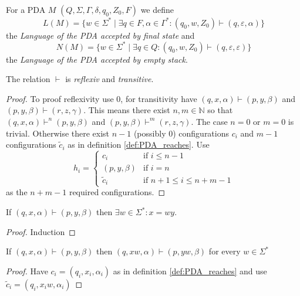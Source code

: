 \begin{definition}
  \label{def:PDA_language}

  For a PDA $M$ $(Q,\Sigma,\Gamma,\delta,q_0,Z_0,F)$ we define $$L(M)=\{w\in\Sigma^*\mid
  \exists q\in F,\alpha\in\Gamma^*: (q_0,w,Z_0)\vdash(q,\varepsilon,\alpha)\}$$ the
  \emph {Language of the PDA accepted by final state} and $$N(M)=\{w\in\Sigma^*\mid
  \exists q\in Q: (q_0,w,Z_0)\vdash(q,\varepsilon,\varepsilon)\}$$ the
  \emph {Language of the PDA accepted by empty stack}.

\end{definition}
\begin{theorem}\label{thm:PDA_reaches}
  The relation $\vdash$ is \emph{reflexiv} and \emph{transitive}.
\end{theorem}
\begin{proof}
  To proof reflexivity use $0$,
  for transitivity have  $(q,x,\alpha)\vdash(p,y,\beta)$ and
  $(p,y,\beta)\vdash(r,z,\gamma)$. This means there exist $n,m\in\mathbb{N}$ so that
  $(q,x,\alpha)\vdash^n(p,y,\beta)$ and $(p,y,\beta)\vdash^m(r,z,\gamma)$.
  The case $n=0$ or $m=0$ is trivial. Otherwise there exist $n-1$ (possibly $0$) configurations
  $c_i$ and $m-1$ configurations $\tilde{c}_i$ as in definition \ref{def:PDA_reaches}.
  Use
  $$
  h_i =
  \begin{cases}
    c_i          & \text{if } i\le n-1 \\
    (p,y,\beta) & \text{if } i = n \\
    \tilde{c}_i  & \text{if } n+1\le i \le n+m-1
  \end{cases}
  $$
  as the $n+m-1$ required configurations.
\end{proof}
\begin{theorem}\label{thm:PDA_reaches_input_decreasing}
  If $(q,x,\alpha)\vdash(p,y,\beta)$ then $\exists w\in\Sigma^*: x=wy$.
\end{theorem}
\begin{proof}
  Induction
\end{proof}
\begin{theorem}\label{thm:PDA_reaches_unconsumed_input}
  If $(q,x,\alpha)\vdash(p,y,\beta)$ then $(q,xw,\alpha)\vdash(p,yw,\beta)$ for
  every $w\in\Sigma^*$
\end{theorem}
\begin{proof}
  Have $c_i = (q_i,x_i,\alpha_i)$ as in definition \ref{def:PDA_reaches} and use
  $\tilde{c}_i = (q_i,x_iw,\alpha_i)$
\end{proof}
